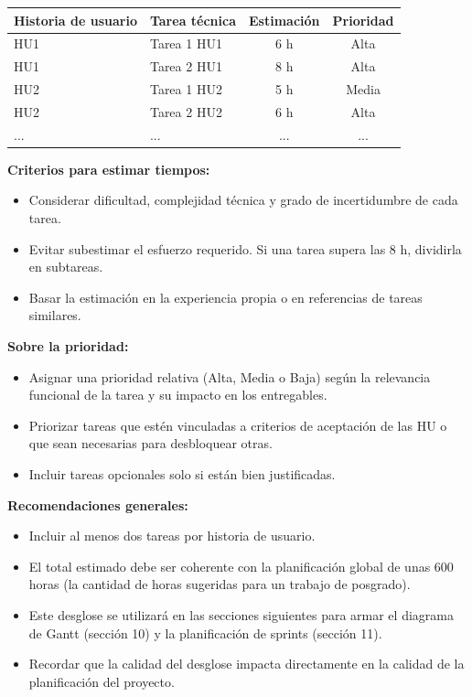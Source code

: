 \documentclass[
11pt, %
]{ProyectoVpC}
\begin{document}
\begin{table}[htpb]
\centering
\begin{tabularx}{\linewidth}{@{}|X|X|c|c|@{}}
\hline
\rowcolor[HTML]{C0C0C0}
Historia de usuario & Tarea técnica & Estimación & Prioridad \\ \hline
HU1 & Tarea 1 HU1 & 6 h & Alta \\ \hline
HU1 & Tarea 2 HU1 & 8 h & Alta \\ \hline
HU2 & Tarea 1 HU2 & 5 h & Media \\ \hline
HU2 & Tarea 2 HU2 & 6 h & Alta \\ \hline
... & ... & ... & ... \\ \hline
\end{tabularx}
\end{table}

\textbf{Criterios para estimar tiempos:}
\begin{itemize}
  \item Considerar dificultad, complejidad técnica y grado de incertidumbre de cada tarea.
  \item Evitar subestimar el esfuerzo requerido. Si una tarea supera las 8 h, dividirla en subtareas.
  \item Basar la estimación en la experiencia propia o en referencias de tareas similares.
\end{itemize}

\textbf{Sobre la prioridad:}
\begin{itemize}
  \item Asignar una prioridad relativa (Alta, Media o Baja) según la relevancia funcional de la tarea y su impacto en los entregables.
  \item Priorizar tareas que estén vinculadas a criterios de aceptación de las HU o que sean necesarias para desbloquear otras.
  \item Incluir tareas opcionales solo si están bien justificadas.
\end{itemize}

\textbf{Recomendaciones generales:}
\begin{itemize}
  \item Incluir al menos dos tareas por historia de usuario.
  \item El total estimado debe ser coherente con la planificación global de unas 600 horas (la cantidad de horas sugeridas para un trabajo de posgrado).
  \item Este desglose se utilizará en las secciones siguientes para armar el diagrama de Gantt (sección 10) y la planificación de sprints (sección 11).
  \item Recordar que la calidad del desglose impacta directamente en la calidad de la planificación del proyecto.
\end{itemize}
\end{document}
